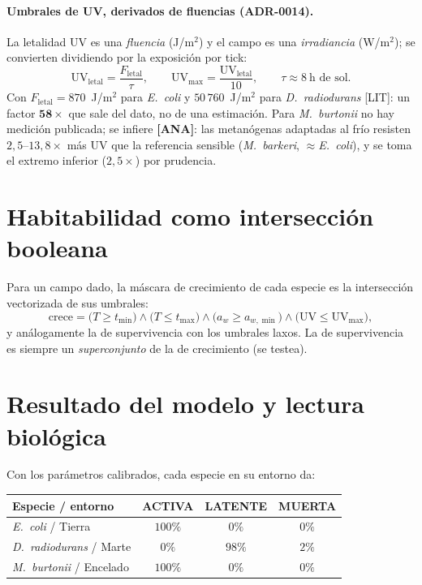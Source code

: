 \documentclass[11pt]{article}
\newcommand{\MUERTA}{\textcolor{acmuerta}{\textsf{MUERTA}}}
\newcommand{\LATENTE}{\textcolor{aclatente}{\textsf{LATENTE}}}
\newcommand{\ACTIVA}{\textcolor{acactiva}{\textsf{ACTIVA}}}
\begin{document}
\paragraph{Umbrales de UV, derivados de fluencias (ADR-0014).} La letalidad UV es
una \emph{fluencia} (J/m$^2$) y el campo es una \emph{irradiancia} (W/m$^2$); se
convierten dividiendo por la exposición por tick:
\begin{equation}
\mathrm{UV}_{\text{letal}}=\frac{F_{\text{letal}}}{\tau},\qquad
\mathrm{UV}_{\max}=\frac{\mathrm{UV}_{\text{letal}}}{10},\qquad \tau\approx 8\ \text{h de sol.}
\end{equation}
Con $F_{\text{letal}}=870$~J/m$^2$ para \emph{E.\ coli} y $50\,760$~J/m$^2$ para
\emph{D.\ radiodurans} [LIT]: un factor $\mathbf{58\times}$ que sale del dato, no de
una estimación. Para \emph{M.\ burtonii} no hay medición publicada; se infiere
\textbf{[ANA]}: las metanógenas adaptadas al frío resisten $2{,}5$--$13{,}8\times$
más UV que la referencia sensible (\emph{M.\ barkeri}, $\approx$\emph{E.\ coli}), y
se toma el extremo inferior ($2{,}5\times$) por prudencia.

\section{Habitabilidad como intersección booleana}

Para un campo dado, la máscara de crecimiento de cada especie es la intersección
vectorizada de sus umbrales:
\[
\text{crece}=\big(T\ge t_{\min}\big)\wedge\big(T\le t_{\max}\big)
\wedge\big(a_w\ge a_{w,\min}\big)\wedge\big(\mathrm{UV}\le \mathrm{UV}_{\max}\big),
\]
y análogamente la de supervivencia con los umbrales laxos. La de supervivencia es
siempre un \emph{superconjunto} de la de crecimiento (se testea).

\section{Resultado del modelo y lectura biológica}

Con los parámetros calibrados, cada especie en su entorno da:
\begin{center}\small
\begin{tabular}{@{}lccc@{}}
\toprule
Especie / entorno & \ACTIVA & \LATENTE & \MUERTA \\
\midrule
\emph{E.\ coli} / Tierra & $100\%$ & $0\%$ & $0\%$ \\
\emph{D.\ radiodurans} / Marte & $0\%$ & $98\%$ & $2\%$ \\
\emph{M.\ burtonii} / Encelado & $100\%$ & $0\%$ & $0\%$ \\
\bottomrule
\end{tabular}
\end{center}
\end{document}
